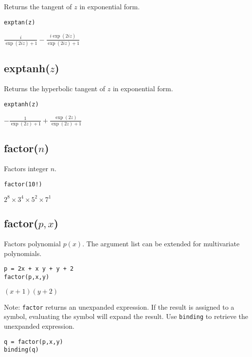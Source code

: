 Returns the tangent of $z$ in exponential form.

{\color{blue}
\begin{verbatim}
exptan(z)
\end{verbatim}
}

\noindent
$\displaystyle \frac{i}{\exp(2iz)+1}-\frac{i\exp(2iz)}{\exp(2iz)+1}$

\subsection*{exptanh($z$)}

Returns the hyperbolic tangent of $z$ in exponential form.

{\color{blue}
\begin{verbatim}
exptanh(z)
\end{verbatim}
}

\noindent
$\displaystyle -\frac{1}{\exp(2z)+1}+\frac{\exp(2z)}{\exp(2z)+1}$

\subsection*{factor($n$)}

Factors integer $n$.

{\color{blue}
\begin{verbatim}
factor(10!)
\end{verbatim}
}

\noindent
$\displaystyle 2^8\times 3^4\times 5^2\times 7^1$

\subsection*{factor($p,x$)}

Factors polynomial $p(x)$.
The argument list can be extended for multivariate polynomials.

{\color{blue}
\begin{verbatim}
p = 2x + x y + y + 2
factor(p,x,y)
\end{verbatim}
}

\noindent
$\displaystyle (x+1)(y+2)$

\bigskip
\noindent
Note:
\verb$factor$
returns an unexpanded expression.
If the result is assigned to a symbol, evaluating the symbol will expand the result.
Use
\verb$binding$
to retrieve the unexpanded expression.

{\color{blue}
\begin{verbatim}
q = factor(p,x,y)
binding(q)
\end{verbatim}
}

